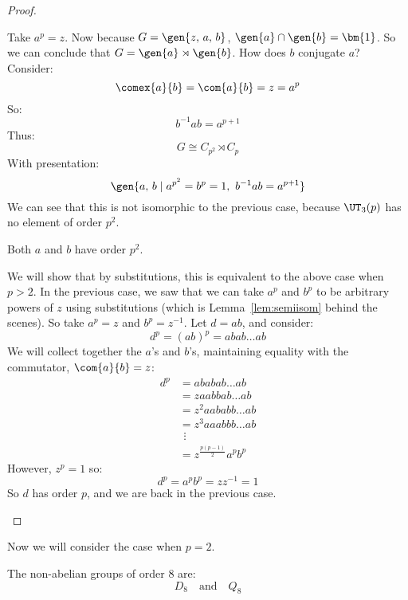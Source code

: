 \begin{proof}
\begin{case}
        Take \(a^p = z\).
        Now because \(G = \gen{z,\,a,\,b}\), \(\gen{a} \cap \gen{b} = \bm{1}\).
        So we can conclude that \(G = \gen{a} \rtimes \gen{b}\).
        How does \(b\) conjugate \(a\)?
        Consider:
        \[\comex{a}{b} = \com{a}{b} = z = a^p\]
        So:
        \[b^{-1}ab = a^{p + 1}\]
        Thus:
        \[G \cong C_{p^2} \rtimes C_p\]
        With presentation:
        \[\gen{a,\,b \mid a^{p^2} = b^p = 1,\ b^{-1}ab = a^{p + 1}}\]
        We can see that this is not isomorphic to the previous case, because \(\UT_3(p)\) has no element of order \(p^2\).

    \item Both \(a\) and \(b\) have order \(p^2\).

        We will show that by substitutions, this is equivalent to the above case when \(p > 2\).
        In the previous case, we saw that we can take \(a^p\) and \(b^p\) to be arbitrary powers of \(z\) using
        substitutions (which is Lemma~\ref{lem:semiisom} behind the scenes).
        So take \(a^p = z\) and \(b^p = z^{-1}\).
        Let \(d = ab\), and consider:
        \[ d^p = {(ab)}^p = abab\ldots ab\]
        We will collect together the \(a\)'s and \(b\)'s, maintaining equality with the commutator, \(\com{a}{b} = z\):
        \begin{align*}
            d^p &= ababab\ldots ab \\
            &= z aabbab\ldots ab \\
            &= z^2 aababb\ldots ab \\
            &= z^3 aaabbb\ldots ab \\
            &\ \,\vdots \\  %
            &= z^{\frac{p(p-1)}{2}} a^p b^p \tag{\ddag} \label{eqn:p_cubed_ddag}
        \end{align*}
        However, \(z^p = 1\) so:
        \[d^p = a^p b^p = zz^{-1} = 1\]
        So \(d\) has order \(p\), and we are back in the previous case.
\end{case}
\end{proof}

Now we will consider the case when \(p = 2\).
\begin{lemma}
    The non-abelian groups of order 8 are:
    \[%
        D_8 \quad \text{and} \quad%
        Q_8
    \]
\end{lemma}


